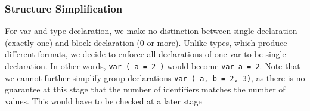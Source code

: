 \documentclass[11pt]{article}
\begin{document}
\subsubsection{Structure Simplification}
\label{sec:org4ab467d}
For var and type declaration, we make no distinction between
single declaration (exactly one) and block declaration (0 or
more). Unlike types, which produce different formats, we decide to
enforce all declarations of one var to be single declaration. In
other words, \texttt{var ( a = 2 )} would become \texttt{var a = 2}. Note that
we cannot further simplify group declarations \texttt{var ( a, b = 2,
    3)}, as there is no guarantee at this stage that the number of
identifiers matches the number of values. This would have to be
checked at a later stage
\end{document}
